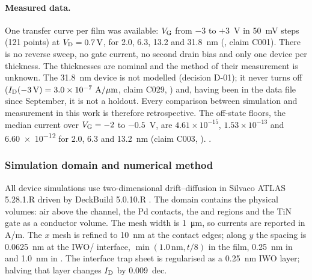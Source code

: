 \paragraph{Measured data.} One transfer curve per film was available: $V_{\mathrm{G}}$ from $-3$ to $+3$~V in \SI{50}{mV} steps
(121 points) at $V_{\mathrm{D}} = \SI{0.7}{V}$, for 2.0, 6.3, 13.2 and \SI{31.8}{nm}
(, claim C001). %
There is no reverse sweep, no gate current, no second drain bias and only one device per thickness. %
The thicknesses are nominal and the method of their measurement is unknown. %
The \SI{31.8}{nm} device is not modelled (decision D-01); it never turns off ($I_{\mathrm{D}}(-3\,\mathrm{V}) =
\SI{3.0e-7}{\ensuremath{\,\mathrm{A}/\mu\mathrm{m}}}$, claim C029, ) and, having been in the data file since September, it is not a
holdout. %
Every comparison between simulation and measurement in this work is therefore retrospective. %
The off-state floors, the median current over $V_{\mathrm{G}} = -2$ to $-0.5$~V, are $4.61\times10^{-15}$, $1.53\times10^{-13}$
and \SI{6.60e-12}{\Aum} for 2.0, 6.3 and \SI{13.2}{nm} (claim C003, ). %
.

\subsubsection{Simulation domain and numerical method}
\label{sec:m-tcad-numerics}

All device simulations use two-dimensional drift--diffusion in Silvaco ATLAS 5.28.1.R driven by DeckBuild 5.0.10.R
\citep{AtlasManual,DeckBuildManual}. %
The domain contains the physical volumes: air above the channel, the Pd contacts, the \AlO{} and \HfO{} regions and
the TiN gate as a conductor volume. %
The mesh width is \SI{1}{\micro\metre}, so currents are reported in A/\textmu m. %
The $x$ mesh is refined to \SI{10}{nm} at the contact edges; along $y$ the spacing is \SI{0.0625}{nm} at the
IWO/\AlO{} interface, $\min(1.0\,\mathrm{nm}, t/8)$ in the film, \SI{0.25}{nm} in \AlO{} and \SI{1.0}{nm} in \HfO{}. %
The interface trap sheet is regularised as a \SI{0.25}{nm} IWO layer; halving that layer changes $I_{\mathrm{D}}$ by
\SI{0.009}{dec}. %

